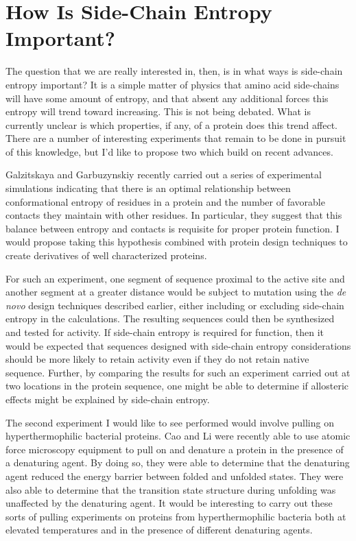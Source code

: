 \section*{How Is Side-Chain Entropy Important?}
\label{sec:how_is_side_chain_entropy_important_}
The question that we are really interested in, then, is in what ways is side-chain entropy important? It is a simple matter of physics that amino acid side-chains will have some amount of entropy, and that absent any additional forces this entropy will trend toward increasing. This is not being debated. What is currently unclear is which properties, if any, of a protein does this trend affect. There are a number of interesting experiments that remain to be done in pursuit of this knowledge, but I'd like to propose two which build on recent advances.

Galzitskaya and Garbuzynskiy recently carried out a series of experimental simulations indicating that there is an optimal relationship between conformational entropy of residues in a protein and the number of favorable contacts they maintain with other residues\cite{Galzitskaya:2006p35}. In particular, they suggest that this balance between entropy and contacts is requisite for proper protein function. I would propose taking this hypothesis combined with protein design techniques to create derivatives of well characterized proteins.

For such an experiment, one segment of sequence proximal to the active site and another segment at a greater distance would be subject to mutation using the \emph{de novo} design techniques described earlier, either including or excluding side-chain entropy in the calculations. The resulting sequences could then be synthesized and tested for activity. If side-chain entropy is required for function, then it would be expected that sequences designed with side-chain entropy considerations should be more likely to retain activity even if they do not retain native sequence. Further, by comparing the results for such an experiment carried out at two locations in the protein sequence, one might be able to determine if allosteric effects might be explained by side-chain entropy.

The second experiment I would like to see performed would involve pulling on hyperthermophilic bacterial proteins. Cao and Li were recently able to use atomic force microscopy equipment to pull on and denature a protein in the presence of a denaturing agent\cite{Cao:2008p142}. By doing so, they were able to determine that the denaturing agent reduced the energy barrier between folded and unfolded states. They were also able to determine that the transition state structure during unfolding was unaffected by the denaturing agent. It would be interesting to carry out these sorts of pulling experiments on proteins from hyperthermophilic bacteria both at elevated temperatures and in the presence of different denaturing agents.

